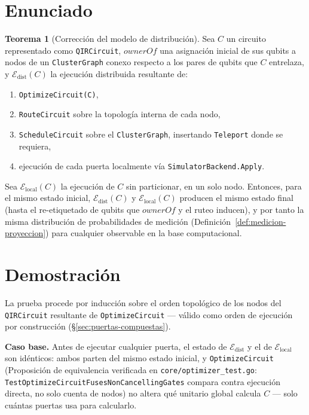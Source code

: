 \documentclass[12pt, a4paper, openany]{report}
\theoremstyle{definition}
\newtheorem{theorem}{Teorema}[chapter]
\begin{document}
\section{Enunciado}

\begin{theorem}[Corrección del modelo de distribución]
\label{thm:correccion-distribuida}
Sea $C$ un circuito representado como \texttt{QIRCircuit}, $\mathit{ownerOf}$ una asignación inicial de sus qubits a nodos de un \texttt{ClusterGraph} conexo respecto a los pares de qubits que $C$ entrelaza, y $\mathcal{E}_{\text{dist}}(C)$ la ejecución distribuida resultante de:
\begin{enumerate}
  \item \texttt{OptimizeCircuit(C)},
  \item \texttt{RouteCircuit} sobre la topología interna de cada nodo,
  \item \texttt{ScheduleCircuit} sobre el \texttt{ClusterGraph}, insertando \texttt{Teleport} donde se requiera,
  \item ejecución de cada puerta localmente vía \texttt{SimulatorBackend.Apply}.
\end{enumerate}
Sea $\mathcal{E}_{\text{local}}(C)$ la ejecución de $C$ sin particionar, en un solo nodo. Entonces, para el mismo estado inicial, $\mathcal{E}_{\text{dist}}(C)$ y $\mathcal{E}_{\text{local}}(C)$ producen el mismo estado final (hasta el re-etiquetado de qubits que $\mathit{ownerOf}$ y el ruteo inducen), y por tanto la misma distribución de probabilidades de medición (Definición~\ref{def:medicion-proyeccion}) para cualquier observable en la base computacional.
\end{theorem}

\section{Demostración}

La prueba procede por inducción sobre el orden topológico de los nodos del \texttt{QIRCircuit} resultante de \texttt{OptimizeCircuit} — válido como orden de ejecución por construcción (\S\ref{sec:puertas-compuestas}).

\textbf{Caso base.} Antes de ejecutar cualquier puerta, el estado de $\mathcal{E}_{\text{dist}}$ y el de $\mathcal{E}_{\text{local}}$ son idénticos: ambos parten del mismo estado inicial, y \texttt{OptimizeCircuit} (Proposición de equivalencia verificada en \texttt{core/optimizer\_test.go}: \texttt{TestOptimizeCircuitFusesNonCancellingGates} compara contra ejecución directa, no solo cuenta de nodos) no altera qué unitario global calcula $C$ — solo cuántas puertas usa para calcularlo.
\end{document}
